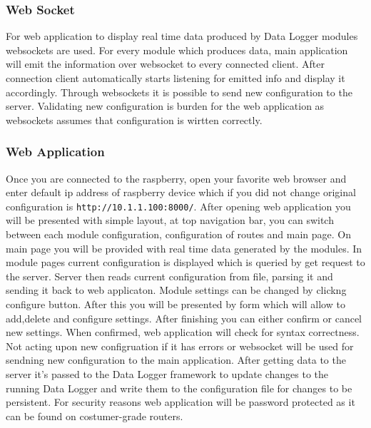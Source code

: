 \subsubsection{Web Socket} %
\label{ssub:web_socket}
For web application to display real time data produced by Data Logger modules websockets are used. For every module which produces data, main application will emit the information over websocket to every connected client. After connection client automatically starts listening for emitted info and display it accordingly. Through websockets it is possible to send new configuration to the server. Validating new configuration is burden for the web application as websockets assumes that configuration is wirtten correctly.
\subsubsection{Web Application} %
\label{ssub:web_application}
Once you are connected to the raspberry, open your favorite web browser and enter default ip address of raspberry device which if you did not change original configuration is \verb|http://10.1.1.100:8000/|. After opening web application you will be presented with simple layout, at top navigation bar, you can switch between each module configuration, configuration of routes and main page. On main page you will be provided with real time data generated by the modules. In module pages current configuration is displayed which is queried by get request to the server. Server then reads current configuration from file, parsing it and sending it back to web applicaton. Module settings can be changed by clickng configure button. After this you will be presented by form which will allow to add,delete and configure settings. After finishing you can either confirm or cancel new settings. When confirmed, web application will check for syntax correctness. Not acting upon new configruation if it has errors or websocket will be used for sendning new configuration to the main application. After getting data to the server it's passed to the Data Logger framework to update changes to the running Data Logger and write them to the configuration file for changes to be persistent. For security reasons web application will be password protected as it can be found on costumer-grade routers.








